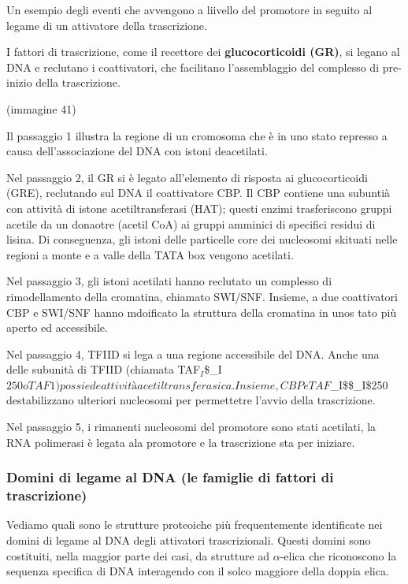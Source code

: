 \documentclass[]{article}
\begin{document}
Un esempio degli eventi che avvengono a liivello del promotore in
seguito al legame di un attivatore della trascrizione.

I fattori di trascrizione, come il recettore dei \textbf{glucocorticoidi
(GR)}, si legano al DNA e reclutano i coattivatori, che facilitano
l'assemblaggio del complesso di pre-inizio della trascrizione.

(immagine 41)

Il passaggio 1 illustra la regione di un cromosoma che è in uno stato
represso a causa dell'associazione del DNA con istoni deacetilati.

Nel passaggio 2, il GR si è legato all'elemento di risposta ai
glucocorticoidi (GRE), reclutando sul DNA il coattivatore CBP. Il CBP
contiene una subuntià con attività di istone acetiltransferasi (HAT);
questi enzimi trasferiscono gruppi acetile da un donaotre (acetil CoA)
ai gruppi amminici di specifici residui di lisina. Di conseguenza, gli
istoni delle particelle core dei nucleosomi skituati nelle regioni a
monte e a valle della TATA box vengono acetilati.

Nel passaggio 3, gli istoni acetilati hanno reclutato un complesso di
rimodellamento della cromatina, chiamato SWI/SNF. Insieme, a due
coattivatori CBP e SWI/SNF hanno mdoificato la struttura della cromatina
in unos tato più aperto ed accessibile.

Nel passaggio 4, TFIID si lega a una regione accessibile del DNA. Anche
una delle subunità di TFIID (chiamata
TAF\(_I\)\$\_I\(250 o TAF1) possiede attività acetiltransferasica. Insieme, CBP e TAF\)\_I\$\$\_I\$250
destabilizzano ulteriori nucleosomi per permettetre l'avvio della
trascrizione.

Nel passaggio 5, i rimanenti nucleosomi del promotore sono stati
acetilati, la RNA polimerasi è legata ala promotore e la trascrizione
sta per iniziare.

\subsubsection{Domini di legame al DNA (le famiglie di fattori di
trascrizione)}\label{domini-di-legame-al-dna-le-famiglie-di-fattori-di-trascrizione}

Vediamo quali sono le strutture proteoiche più frequentemente
identificate nei domini di legame al DNA degli attivatori
trascrizionali. Questi domini sono costituiti, nella maggior parte dei
casi, da strutture ad \(\alpha\)-elica che riconoscono la sequenza
specifica di DNA interagendo con il solco maggiore della doppia elica.
\end{document}

